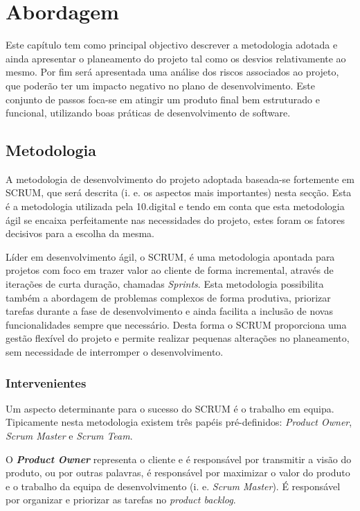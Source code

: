 \chapter{Abordagem}
\label{sec:abordagem}

Este capítulo tem como principal objectivo descrever a metodologia adotada e ainda apresentar o planeamento do projeto tal como os desvios relativamente ao mesmo. Por fim será apresentada uma análise dos riscos associados ao projeto, que poderão ter um impacto negativo no plano de desenvolvimento. Este conjunto de passos foca-se em atingir um produto final bem estruturado e funcional, utilizando boas práticas de desenvolvimento de software.


\section{Metodologia}
\label{metodologia}

A metodologia de desenvolvimento do projeto adoptada baseada-se fortemente em SCRUM\cite{scrum}, que será descrita (i. e. os aspectos mais importantes) nesta secção. Esta é a metodologia utilizada pela 10.digital e tendo em conta que esta metodologia ágil se encaixa perfeitamente nas necessidades do projeto, estes foram os fatores decisivos para a escolha da mesma. 

Líder em desenvolvimento ágil, o SCRUM, é uma metodologia apontada para projetos com foco em trazer valor ao cliente de forma incremental, através de iterações de curta duração, chamadas \textit{Sprints}. Esta metodologia possibilita também a abordagem de problemas complexos de forma produtiva, priorizar tarefas durante a fase de desenvolvimento e ainda facilita a inclusão de novas funcionalidades sempre que necessário. Desta forma o SCRUM proporciona uma gestão flexível do projeto e permite realizar pequenas alterações no planeamento, sem necessidade de interromper o desenvolvimento.

\subsection{Intervenientes}

Um aspecto determinante para o sucesso do SCRUM é o trabalho em equipa. Tipicamente nesta metodologia existem três papéis pré-definidos: \textit{Product Owner}, \textit{Scrum Master} e \textit{Scrum Team}.

O \textbf{\textit{Product Owner}} representa o cliente e é responsável por transmitir a visão do produto, ou por outras palavras, é responsável por maximizar o valor do produto e o trabalho da equipa de desenvolvimento (i. e. \textit{Scrum Master}). É responsável por organizar e priorizar as tarefas no \textit{product backlog}.

